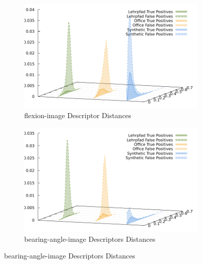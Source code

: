 \begin{figure}[H]
\begin{subfigure}[t]{0.45\linewidth}
    \includegraphics[width=\linewidth]{chapter06/results/SURF/flexion/descriptor_distances.pdf}%
    \caption{\gls{flexion-image} Descriptor Distances}
\end{subfigure}\quad
\begin{subfigure}[t]{0.45\linewidth}
    \includegraphics[width=\linewidth]{chapter06/results/SURF/bearing/descriptor_distances.pdf}%
    \caption{\gls{bearing-angle-image} Descriptors Distances}
\end{subfigure}
\end{figure}

